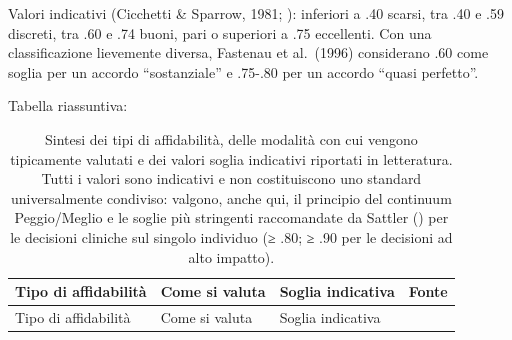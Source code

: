 \documentclass[
  italian,
  letterpaper,
  paper=A4,
  headinclude=on,
  footinclude=on,
  12pt]{scrbook}
\begin{document}
Valori indicativi (Cicchetti \& Sparrow, 1981;
\cite{slick2006psychometrics}): inferiori a .40 scarsi, tra .40 e .59
discreti, tra .60 e .74 buoni, pari o superiori a .75 eccellenti. Con
una classificazione lievemente diversa, Fastenau et al.~(1996)
considerano .60 come soglia per un accordo ``sostanziale'' e .75-.80 per
un accordo ``quasi perfetto''.

Tabella riassuntiva:

\begin{longtable}[]{@{}
  >{\raggedright\arraybackslash}p{}
  >{\raggedright\arraybackslash}p{}
  >{\raggedright\arraybackslash}p{}
  >{\raggedright\arraybackslash}p{}@{}}
\caption{Sintesi dei tipi di affidabilità, delle modalità con cui
vengono tipicamente valutati e dei valori soglia indicativi riportati in
letteratura. Tutti i valori sono indicativi e non costituiscono uno
standard universalmente condiviso: valgono, anche qui, il principio del
continuum Peggio/Meglio e le soglie più stringenti raccomandate da
Sattler (\citeyear{sattler2001assessment}) per le decisioni cliniche sul
singolo individuo (≥ .80; ≥ .90 per le decisioni ad alto
impatto).}\label{tbl-affidabilita}\tabularnewline
\toprule\noalign{}
\begin{minipage}[b]{\linewidth}\raggedright
Tipo di affidabilità
\end{minipage} & \begin{minipage}[b]{\linewidth}\raggedright
Come si valuta
\end{minipage} & \begin{minipage}[b]{\linewidth}\raggedright
Soglia indicativa
\end{minipage} & \begin{minipage}[b]{\linewidth}\raggedright
Fonte
\end{minipage} \\
\midrule\noalign{}
\endfirsthead
\toprule\noalign{}
\begin{minipage}[b]{\linewidth}\raggedright
Tipo di affidabilità
\end{minipage} & \begin{minipage}[b]{\linewidth}\raggedright
Come si valuta
\end{minipage} & \begin{minipage}[b]{\linewidth}\raggedright
Soglia indicativa
\end{minipage} & \begin{minipage}[b]{\linewidth}\raggedright

\end{minipage}
\end{longtable}
\end{document}
